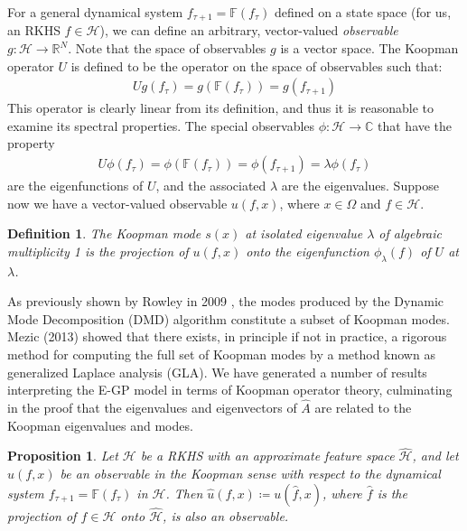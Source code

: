\documentclass[letterpaper,12pt,peerreviewca,draftcls]{IEEEtran}
\newtheorem{definition}{Definition}
\newtheorem{proposition}{Proposition}
\newcommand{\R}{\mathbb{R}}
\newcommand{\C}{\mathbb{C}}
\newcommand{\fspace}{\mathcal{H}}
\newcommand{\fmap}{\psi}
\newcommand{\dom}{\Omega}
\newcommand{\nsamp}{N}
\newcommand{\ncent}{M}
\newcommand{\eqlabel}[1]{\label{eq:#1}}
\newcommand{\fspaceApprox}{\widehat{\fspace}}
\newcommand{\fmapApprox}{\widehat{\fmap}}
\newcommand{\fspaceEl}{f}
\newcommand{\fspaceApproxEl}{\widehat{\fspaceEl}}
\newcommand{\dualop}{A}
\newcommand{\dualopApprox}{\widehat{\dualop}}
\newcommand{\tindex}{\tau}
\begin{document}
For a general dynamical system $f_{\tindex+1} = \mathbb{F}(f_{\tindex})$ defined on a state space (for us, an RKHS $f\in\fspace$), we can define an arbitrary, vector-valued \emph{observable} $g : \fspace \to \R^{\nsamp}$. Note that the space of observables $g$ is a vector space. The Koopman operator $U$ is defined to be the operator on the space of observables such that:
\begin{align} \eqlabel{koopman_operator}
U g(f_{\tindex}) = g(\mathbb{F}(f_{\tindex})) = g(f_{\tindex+1})
\end{align}
This operator is clearly linear from its definition, and thus it is reasonable to examine its spectral properties. The special observables $\phi : \fspace \to \C$ that have the property
\begin{align} \eqlabel{koopman_eigenfunctions}
U \phi(f_{\tindex}) = \phi(\mathbb{F}(f_{\tindex})) = \phi(f_{\tindex+1}) = \lambda \phi(f_{\tindex})
\end{align}
are the eigenfunctions of $U$, and the associated $\lambda$ are the eigenvalues. Suppose now we have a vector-valued observable $u(\fspaceEl,x)$, where $x\in\dom$ and $\fspaceEl\in\fspace$.

\begin{definition}
	The Koopman mode $s(x)$ at isolated eigenvalue $\lambda$ of algebraic multiplicity 1 is the projection of $u(f,x)$ onto the eigenfunction $\phi_{\lambda}(\fspaceEl)$ of $U$ at $\lambda$. \cite{mezic2013analysis}
\end{definition}

As previously shown by Rowley in 2009 \cite{rowley2009spectral}, the modes produced by the Dynamic Mode Decomposition (DMD) algorithm constitute a subset of Koopman modes. Mezic (2013) \cite{mezic2013analysis} showed that there exists, in principle if not in practice, a rigorous method for computing the full set of Koopman modes by a method known as generalized Laplace analysis (GLA). We have generated a number of results interpreting the E-GP model in terms of Koopman operator theory, culminating in the proof that the eigenvalues and eigenvectors of $\dualopApprox$ are related to the Koopman eigenvalues and modes.

\begin{proposition}\label{thm:ApproxObsv}
	Let $\fspace$ be a RKHS with  an approximate feature space $\fspaceApprox$, and let $u(\fspaceEl,x)$ be an observable in the Koopman sense with respect to the dynamical system $f_{\tindex+1} = \mathbb{F}(f_{\tindex})$ in $\fspace$. Then $\hat u(\fspaceEl,x) \coloneqq u(\fspaceApproxEl,x)$, where $\fspaceApproxEl$ is the projection of $\fspaceEl\in\fspace$ onto $\fspaceApprox$, is also an observable.
\end{proposition}
\end{document}
